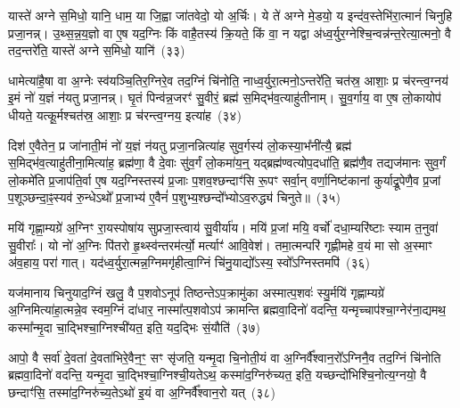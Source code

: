 {\anuvakamend[{आ॒गच्छा॒त्तद्व्या॑न॒शुस्तेने॒मं य॒ज्ञं नो॑ वह॒ सुव॑र्दे॒वेषु॒ गन्त॑वे॒ चतु॑र्दश च}]}%

यास्ते॑ अग्ने स॒मिधो॒ यानि॒ धाम॒ या जि॒ह्वा जा॑तवेदो॒ यो अ॒र्चिः। ये ते॑ अग्ने मे॒डयो॒ य इन्द॑व॒स्तेभि॑रा॒त्मानं॑ चिनुहि प्रजा॒नन्न्। उ॒थ्स॒न्न॒य॒ज्ञो वा ए॒ष यद॒ग्निः किं वाहै॒तस्य॑ क्रि॒यते॒ किं वा॒ न यद्वा अ॑ध्व॒र्युर॒ग्नेश्चि॒न्वन्न॑न्त॒रेत्या॒त्मनो॒ वै तद॒न्तरे॑ति॒ यास्ते॑ अग्ने स॒मिधो॒ यानि॑~(३३)

धामेत्या॑है॒षा वा अ॒ग्नेः स्व॑यञ्चि॒तिर॒ग्निरे॒व तद॒ग्निं चि॑नोति॒ नाध्व॒र्युरा॒त्मनो॒\-ऽन्तरे॑ति॒ चत॑स्र॒ आशाः॒ प्र च॑रन्त्व॒ग्नय॑ इ॒मं नो॑ य॒ज्ञं न॑यतु प्रजा॒नन्न्। घृ॒तं पिन्व॑न्न॒जरꣳ॑ सु॒वीरं॒ ब्रह्म॑ स॒मिद्भ॑व॒त्याहु॑तीनाम्। सु॒व॒र्गाय॒ वा ए॒ष लो॒कायोप॑ धीयते॒ यत्कू॒र्मश्चत॑स्र॒ आशाः॒ प्र च॑रन्त्व॒ग्नय॒ इत्या॑ह~(३४)

दिश॑ ए॒वैतेन॒ प्र जा॑नाती॒मं नो॑ य॒ज्ञं न॑यतु प्रजा॒नन्नित्या॑ह सुव॒र्गस्य॑ लो॒कस्या॒भ᳚नी॑त्यै॒ ब्रह्म॑ स॒मिद्भ॑व॒त्याहु॑तीना॒मित्या॑ह॒ ब्रह्म॑णा॒ वै दे॒वाः सु॑व॒र्गं लो॒कमा॑य॒न्॒ यद्ब्रह्म॑ण्वत्योप॒दधा॑ति॒ ब्रह्म॑णै॒व तद्यज॑मानः सुव॒र्गं लो॒कमे॑ति प्र॒जा\-प॑ति॒र्वा ए॒ष यद॒ग्निस्तस्य॑ प्र॒जाः प॒शव॒श्छन्दाꣳ॑सि रू॒पꣳ सर्वा॒न् वर्णा॒निष्ट॑कानां कुर्याद्रू॒पेणै॒व प्र॒जां प॒शूञ्छन्दा॒ꣴ॒स्यव॑ रु॒न्धे\-ऽथो᳚ प्र॒जाभ्य॑ ए॒वैनं॑ प॒शुभ्य॒श्छन्दो᳚भ्यो\-ऽव॒रुद्ध्य॑ चिनुते॥~(३५)

{\anuvakamend[{यान्य॒ग्नय॒ इत्या॒हेष्ट॑काना॒ꣳ॒ षोड॑श च}]}%

मयि॑ गृह्णा॒म्यग्रे॑ अ॒ग्निꣳ रा॒यस्पोषा॑य सुप्रजा॒स्त्वाय॑ सु॒वीर्या॑य। मयि॑ प्र॒जां मयि॒ वर्चो॑ दधा॒म्यरि॑ष्टाः स्याम त॒नुवा॑ सु॒वीराः᳚। यो नो॑ अ॒ग्निः पि॑तरो हृ॒थ्स्व॑न्तरम॑र्त्यो॒ मर्त्याꣳ॑ आवि॒वेश॑। तमा॒त्मन्परि॑ गृह्णीमहे व॒यं मा सो अ॒स्माꣳ अ॑व॒हाय॒ परा॑ गात्। यद॑ध्व॒र्युरा॒त्मन्न॒ग्निमगृ॑हीत्वा॒ग्निं चि॑नु॒याद्यो᳚\-ऽस्य॒ स्वो᳚\-ऽग्निस्तमपि॑~(३६)

यज॑मानाय चिनुयाद॒ग्निं खलु॒ वै प॒शवो\-ऽनूप॑ तिष्ठन्ते\-ऽप॒क्रामु॑का अस्मात्प॒शवः॑ स्यु॒र्मयि॑ गृह्णाम्यग्रे॑ अ॒ग्निमित्या॑हा॒त्मन्ने॒व स्वम॒ग्निं दा॑धार॒ नास्मा᳚त्प॒शवो\-ऽप॑ क्रामन्ति ब्रह्मवा॒दिनो॑ वदन्ति॒ यन्मृच्चाप॑श्चा॒ग्नेर॑ना॒द्यमथ॒ कस्मा᳚न्मृ॒दा चा॒द्भिश्चा॒ग्निश्ची॑यत॒ इति॒ यद॒द्भिः सं॒यौति॑~(३७)

आपो॒ वै सर्वा॑ दे॒वता॑ दे॒वता॑भिरे॒वैन॒ꣳ॒ सꣳ सृ॑जति॒ यन्मृ॒दा चि॒नोती॒यं वा अ॒ग्निर्वै᳚श्वान॒रो᳚\-ऽग्निनै॒व तद॒ग्निं चि॑नोति ब्रह्मवा॒दिनो॑ वदन्ति॒ यन्मृ॒दा चा॒द्भिश्चा॒ग्निश्ची॒यते\-ऽथ॒ कस्मा॑द॒ग्निरु॑च्यत॒ इति॒ यच्छन्दो॑भिश्चि॒नोत्य॒ग्नयो॒ वै छन्दाꣳ॑सि॒ तस्मा॑द॒ग्निरु॑च्य॒ते\-ऽथो॑ इ॒यं वा अ॒ग्निर्वै᳚श्वान॒रो यत्~(३८)

